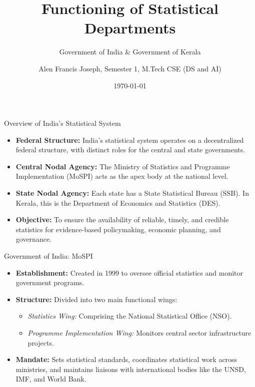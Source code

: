 \documentclass[aspectratio=169]{beamer}
\title[Statistical Depts: GOI \& GOK]{Functioning of Statistical Departments}
\subtitle{Government of India \& Government of Kerala}
\author{Alen Francis Joseph, Semester 1, M.Tech CSE (DS and AI)}
\date{\today}
\begin{document}
\begin{frame}
    \titlepage
\end{frame}

\begin{frame}{Overview of India's Statistical System}
    \begin{itemize}
        \item \textbf{Federal Structure:} India's statistical system operates on a decentralized federal structure, with distinct roles for the central and state governments.
        \item \textbf{Central Nodal Agency:} The Ministry of Statistics and Programme Implementation (MoSPI) acts as the apex body at the national level.
        \item \textbf{State Nodal Agency:} Each state has a State Statistical Bureau (SSB). In Kerala, this is the Department of Economics and Statistics (DES).
        \item \textbf{Objective:} To ensure the availability of reliable, timely, and credible statistics for evidence-based policymaking, economic planning, and governance.
    \end{itemize}
\end{frame}

\begin{frame}{Government of India: MoSPI}
    \begin{itemize}
        \item \textbf{Establishment:} Created in 1999 to oversee official statistics and monitor government programs.
        \item \textbf{Structure:} Divided into two main functional wings:
        \begin{itemize}
            \item \textit{Statistics Wing:} Comprising the National Statistical Office (NSO).
            \item \textit{Programme Implementation Wing:} Monitors central sector infrastructure projects.
        \end{itemize}
        \item \textbf{Mandate:} Sets statistical standards, coordinates statistical work across ministries, and maintains liaisons with international bodies like the UNSD, IMF, and World Bank.
    \end{itemize}
\end{frame}
\end{document}

